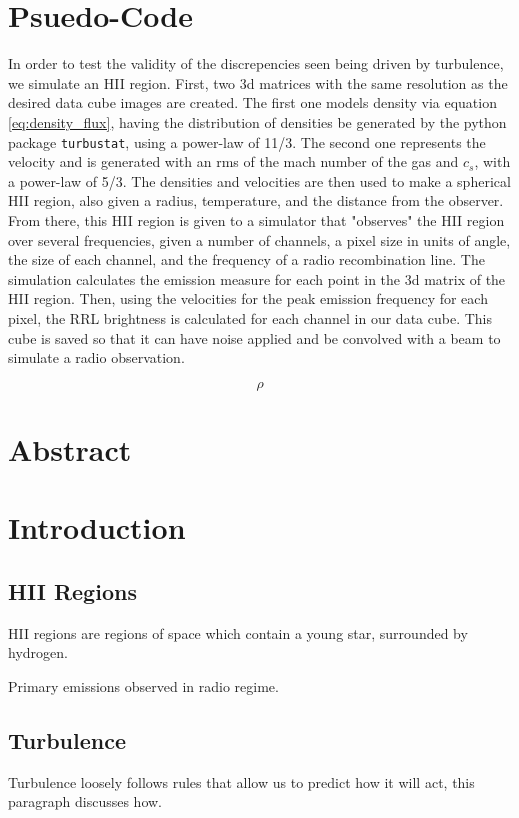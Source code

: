 \documentclass{article}
\def\code#1{\texttt{#1}}
\begin{document}
\section{Psuedo-Code}
In order to test the validity of the discrepencies seen being driven by turbulence, we simulate an HII region. First, two 3d matrices with the same resolution as the desired data cube images are created. The first one models density via equation \ref{eq:density_flux}, having the distribution of densities be generated by the python package \code{turbustat}, using a power-law of 11/3. The second one represents the velocity and is generated with an rms of the mach number of the gas and $c_s$, with a power-law of 5/3. The densities and velocities are then used to make a spherical HII region, also given a radius, temperature, and the distance from the observer. From there, this HII region is given to a simulator that "observes" the HII region over several frequencies, given a number of channels, a pixel size in units of angle, the size of each channel, and the frequency of a radio recombination line. The simulation calculates the emission measure for each point in the 3d matrix of the HII region. Then, using the velocities for the peak emission frequency for each pixel, the RRL brightness is calculated for each channel in our data cube. This cube is saved so that it can have noise applied and be convolved with a beam to simulate a radio observation.

\begin{equation}
  \rho
  \label{eq:density_flux}
\end{equation}

\section{Abstract}
\section{Introduction}
\subsection{HII Regions}
HII regions are regions of space which contain a young star, surrounded by hydrogen.

Primary emissions observed in radio regime.
\subsection{Turbulence}
Turbulence loosely follows rules that allow us to predict how it will act, this paragraph discusses how.
\end{document}
